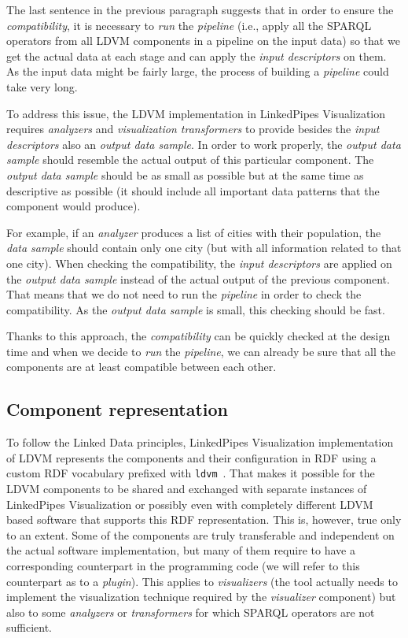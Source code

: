 The last sentence in the previous paragraph suggests that in order to ensure the \emph{compatibility}, it is necessary to \emph{run} the \emph{pipeline} (i.e., apply all the SPARQL operators from all LDVM components in a pipeline on the input data) so that we get the actual data at each stage and can apply the \emph{input descriptors} on them. As the input data might be fairly large, the process of building a \emph{pipeline} could take very long.

To address this issue, the LDVM implementation in LinkedPipes Visualization requires \emph{analyzers} and \emph{visualization transformers} to provide besides the \emph{input descriptors} also an \emph{output data sample}. In order to work properly, the \emph{output data sample} should resemble the actual output of this particular component. The \emph{output data sample} should be as small as possible but at the same time as descriptive as possible (it should include all important data patterns that the component would produce).

For example, if an \emph{analyzer} produces a list of cities with their population, the \emph{data sample} should contain only one city (but with all information related to that one city). When checking the compatibility, the \emph{input descriptors} are applied on the \emph{output data sample} instead of the actual output of the previous component. That means that we do not need to run the \emph{pipeline} in order to check the compatibility. As the \emph{output data sample} is small, this checking should be fast.

Thanks to this approach, the \emph{compatibility} can be quickly checked at the design time and when we decide to \emph{run} the \emph{pipeline}, we can already be sure that all the components are at least compatible between each other.

\subsection{Component representation}
\label{sec:linkedpipes:ldvm-implementation:component-representation}

To follow the Linked Data principles, LinkedPipes Visualization implementation of LDVM represents the  components and their configuration in RDF using a custom RDF vocabulary prefixed with \texttt{ldvm}~\cite{ldvm_vocabulary_paper}\cite{ldvm_vocabulary}. That makes it possible for the LDVM components to be shared and exchanged with separate instances of LinkedPipes Visualization or possibly even with completely different LDVM based software that supports this RDF representation. This is, however, true only to an extent. Some of the components are truly transferable and independent on the actual software implementation, but many of them require to have a corresponding counterpart in the programming code (we will refer to this counterpart as to a \emph{plugin}). This applies to \emph{visualizers} (the tool actually needs to implement the visualization technique required by the \emph{visualizer} component) but also to some \emph{analyzers} or \emph{transformers} for which SPARQL operators are not sufficient.

